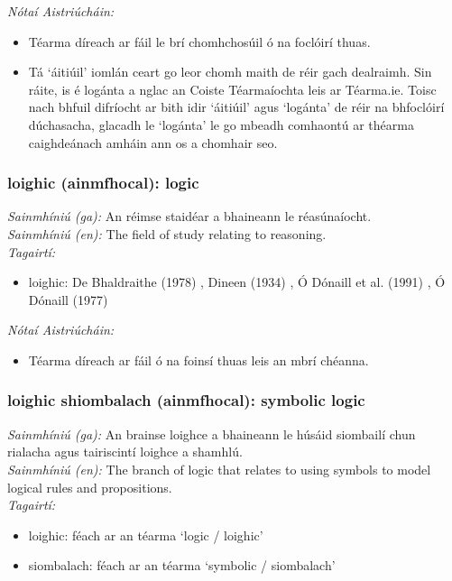 \documentclass{article}
\begin{document}
 \noindent \textit{Nótaí Aistriúcháin:}
\begin{itemize}
	\item Téarma díreach ar fáil le brí chomhchosúil ó na foclóirí thuas.
	\item Tá `áitiúil' iomlán ceart go leor chomh maith de réir gach dealraimh. Sin ráite, is é logánta a nglac an Coiste Téarmaíochta leis ar Téarma.ie. Toisc nach bhfuil difríocht ar bith idir `áitiúil' agus `logánta' de réir na bhfoclóirí dúchasacha, glacadh le `logánta' le go mbeadh comhaontú ar théarma caighdeánach amháin ann os a chomhair seo.
\end{itemize}


\subsubsection*{loighic (ainmfhocal): logic}
 \noindent \textit{Sainmhíniú (ga):} An réimse staidéar a bhaineann le réasúnaíocht.
\\
 \noindent \textit{Sainmhíniú (en):} The field of study relating to reasoning.
\\
 \noindent \textit{Tagairtí:}
\begin{itemize}
	\item loighic: De Bhaldraithe (1978) \cite{de-bhaldraithe}, Dineen (1934) \cite{dineen}, Ó Dónaill et al. (1991) \cite{focloir-beag}, Ó Dónaill (1977) \cite{odonaill}
\end{itemize}

 \noindent \textit{Nótaí Aistriúcháin:}
\begin{itemize}
	\item Téarma díreach ar fáil ó na foinsí thuas leis an mbrí chéanna.
\end{itemize}


\subsubsection*{loighic shiombalach (ainmfhocal): symbolic logic}
 \noindent \textit{Sainmhíniú (ga):} An brainse loighce a bhaineann le húsáid siombailí chun rialacha agus tairiscintí loighce a shamhlú.
\\
 \noindent \textit{Sainmhíniú (en):} The branch of logic that relates to using symbols to model logical rules and propositions.
\\
 \noindent \textit{Tagairtí:}
\begin{itemize}
	\item loighic: féach ar an téarma `logic / loighic'
	\item siombalach: féach ar an téarma `symbolic / siombalach'
\end{itemize}
\end{document}
